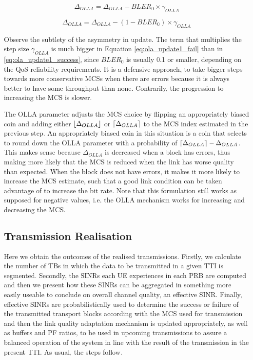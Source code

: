 \begin{equation} \label{eq:ola_update1_success}
    \Delta_{OLLA} = \Delta_{OLLA} + BLER_0 \times \gamma_{OLLA}
\end{equation}

\begin{equation} \label{eq:ola_update1_fail}
    \Delta_{OLLA} = \Delta_{OLLA} - (1 - BLER_0) \times \gamma_{OLLA}
\end{equation}

Observe the subtlety of the asymmetry in update. The term that multiplies the step size $\gamma_{OLLA}$ is much bigger in Equation \eqref{eq:ola_update1_fail} than in \eqref{eq:ola_update1_success}, since $BLER_0$ is usually 0.1 or smaller, depending on the QoS reliability requirements. It is a defensive approach, to take bigger steps towards more conservative MCSs when there are errors because it is always better to have some throughput than none. Contrarily, the progression to increasing the MCS is slower. 

The OLLA parameter adjusts the MCS choice by flipping an appropriately biased coin and adding either $\lfloor\Delta_{OLLA}\rfloor$ or $\lceil\Delta_{OLLA}\rceil$ to the MCS index estimated in the previous step. An appropriately biased coin in this situation is a coin that selects to round down the OLLA parameter with a probability of $\lceil\Delta_{OLLA}\rceil - \Delta_{OLLA}$. This makes sense because $\Delta_{OLLA}$ is decreased when a block has errors, thus making more likely that the MCS is reduced when the link has worse quality than expected. When the block does not have errors, it makes it more likely to increase the MCS estimate, such that a good link condition can be taken advantage of to increase the bit rate. Note that this formulation still works as supposed for negative values, i.e. the OLLA mechanism works for increasing and decreasing the MCS.

\subsection{Transmission Realisation}

Here we obtain the outcomes of the realised transmissions. Firstly, we calculate the number of TBs in which the data to be transmitted in a given TTI is segmented. Secondly, the SINRs each UE experiences in each PRB are computed and then we present how these SINRs can be aggregated in something more easily useable to conclude on overall channel quality, an effective SINR. Finally, effective SINRs are probabilistically used to determine the success or failure of the transmitted transport blocks according with the MCS used for transmission and then the link quality adaptation mechanism is updated appropriately, as well as buffers and PF ratios, to be used in upcoming transmissions to assure a balanced operation of the system in line with the result of the transmission in the present TTI. As usual, the steps follow.

